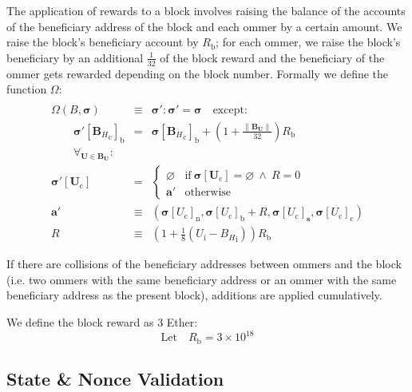 \documentclass[9pt,oneside]{amsart}
\begin{document}
\begin{multicols}{2}
The application of rewards to a block involves raising the balance of the accounts of the beneficiary address of the block and each ommer by a certain amount. We raise the block's beneficiary account by $R_{\mathrm{b}}$; for each ommer, we raise the block's beneficiary by an additional $\frac{1}{32}$ of the block reward and the beneficiary of the ommer gets rewarded depending on the block number.\hypertarget{Omega}{} Formally we define the function $\Omega$:
\begin{eqnarray}
\\ \nonumber
\Omega(B, \boldsymbol{\sigma}) & \equiv & \boldsymbol{\sigma}': \boldsymbol{\sigma}' = \boldsymbol{\sigma} \quad \text{except:} \\
\qquad\boldsymbol{\sigma}'[{\mathbf{B}_{H}}_{\mathrm{c}}]_{\mathrm{b}} & = & \boldsymbol{\sigma}[{\mathbf{B}_{H}}_{\mathrm{c}}]_{\mathrm{b}} + (1 + \frac{\lVert \mathbf{B}_{\mathbf{U}}\rVert}{32})R_{\mathrm{b}} \\
\qquad\forall_{\mathbf{U} \in \mathbf{B}_{\mathbf{U}}}: \\ \nonumber
\boldsymbol{\sigma}'[\mathbf{U}_{\mathrm{c}}] & = & \begin{cases}
\varnothing &\text{if}\ \boldsymbol{\sigma}[\mathbf{U}_{\mathrm{c}}] = \varnothing\ \wedge\ R = 0 \\
\mathbf{a}' &\text{otherwise}
\end{cases} \\
\mathbf{a}' &\equiv& (\boldsymbol{\sigma}[U_{\mathrm{c}}]_{\mathrm{n}}, \boldsymbol{\sigma}[U_{\mathrm{c}}]_{\mathrm{b}} + R, \boldsymbol{\sigma}[U_{\mathrm{c}}]_{\mathbf{s}}, \boldsymbol{\sigma}[U_{\mathrm{c}}]_{\mathrm{c}}) \\
R & \equiv & (1 + \frac{1}{8} (U_{\mathrm{i}} - {B_{H}}_{\mathrm{i}})) R_{\mathrm{b}}
\end{eqnarray}

If there are collisions of the beneficiary addresses between ommers and the block (i.e. two ommers with the same beneficiary address or an ommer with the same beneficiary address as the present block), additions are applied cumulatively.

\hypertarget{block_reward_R__b}{}We define the block reward as 3 Ether:
\begin{equation}
\text{Let} \quad R_{\mathrm{b}} = 3 \times 10^{18}
\end{equation}

\subsection{State \& Nonce Validation}\label{sec:statenoncevalidation}


\end{multicols}
\end{document}
